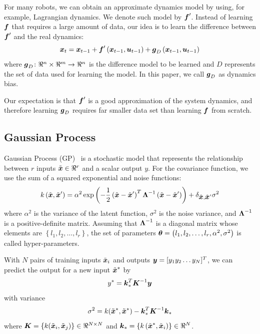 For many robots, we can obtain an approximate dynamics model by using,
for example, Lagrangian dynamics.
We denote such model by $\mbox{\boldmath \(f\)}'$.
Instead of learning $\mbox{\boldmath \(f\)}$ that requires a large amount of data,
our idea is to learn the difference between $\mbox{\boldmath \(f\)}'$ and the real
dynamics:
\begin{equation}
\mbox{\boldmath \(x\)}_t = \mbox{\boldmath \(x\)}_{t-1} + \mbox{\boldmath \(f\)}'\left(\mbox{\boldmath \(x\)}_{t-1},
\mbox{\boldmath \(u\)}_{t-1}\right) +
\mbox{\boldmath \(g\)}_D\left(\mbox{\boldmath \(x\)}_{t-1},\mbox{\boldmath \(u\)}_{t-1}\right)
\end{equation}
where $\mbox{\boldmath \(g\)}_D\colon
\Re^{n}\times\Re^{m}\rightarrow\Re^{n}$ is the difference
model to be learned and $D$ 
represents the set of data used for learning the model.
In this paper, we call $\mbox{\boldmath \(g\)}_D$ as dynamics bias.

Our expectation is that $\mbox{\boldmath \(f\)}'$ is a good approximation of the system
dynamics, and therefore learning $\mbox{\boldmath \(g\)}_D$ requires far smaller
data set than learning $\mbox{\boldmath \(f\)}$ from scratch.

\subsection{Gaussian Process}


Gaussian Process (GP)~\cite{bib-rasmussen-gp} is a stochastic model that
represents the relationship between $r$ inputs
$\tilde{\mbox{\boldmath \(x\)}}\in \Re^{r}$ and a scalar output $y$.
For the covariance function, we use the sum of a squared exponential
and noise functions:
\begin{equation}
k\left(\tilde{\mbox{\boldmath \(x\)}}, \tilde{\mbox{\boldmath \(x\)}}'\right) = \alpha^2 \exp \left(
-\frac{1}{2} \left(\tilde{\mbox{\boldmath \(x\)}} - \tilde{\mbox{\boldmath \(x\)}}'\right)^T
\mbox{\boldmath \(\Lambda\)}^{-1} \left(\tilde{\mbox{\boldmath \(x\)}} - \tilde{\mbox{\boldmath \(x\)}}'\right)
\right)
+ \delta_{\tilde{\mbox{\boldmath \(x\)}}, \tilde{\mbox{\boldmath \(x\)}}'} \sigma^2
\end{equation}
where $\alpha^2$ is the variance of the latent function, $\sigma^2$ is
the noise variance, and $\mbox{\boldmath \(\Lambda\)}^{-1}$ is a positive-definite
matrix. 
Assuming that $\mbox{\boldmath \(\Lambda\)}^{-1}$ is a diagonal matrix whose
elements are $\left\{l_1, l_2, \ldots, l_r\right\}$, the set of
parameters $\mbox{\boldmath \(\theta\)} =
\left(l_1,l_2,\ldots,l_r,\alpha^2,\sigma^2\right)$ is called
hyper-parameters. 

With $N$ pairs of training inputs $\tilde{\mbox{\boldmath \(x\)}}_i$ and outputs
$\mbox{\boldmath \(y\)}=[y_1y_2 \ldots y_N]^T$,
we can predict the output for a new
input $\tilde{\mbox{\boldmath \(x\)}}^*$ by
\begin{equation}
y^* = \mbox{\boldmath \(k\)}_*^T \mbox{\boldmath \(K\)}^{-1} \mbox{\boldmath \(y\)}
\end{equation}
with variance
\begin{equation}
\sigma^2 = k(\tilde{\mbox{\boldmath \(x\)}}^*, \tilde{\mbox{\boldmath \(x\)}}^*) -
\mbox{\boldmath \(k\)}_*^{T} \mbox{\boldmath \(K\)}^{-1} \mbox{\boldmath \(k\)}_*
\end{equation}
where $\mbox{\boldmath \(K\)} = \left\{ k(\tilde{\mbox{\boldmath \(x\)}}_i,
\tilde{\mbox{\boldmath \(x\)}}_j)\right\} \in\Re^{N\times N}$ and 
$\mbox{\boldmath \(k\)}_* = \left\{
k\left(\tilde{\mbox{\boldmath \(x\)}}^*,\tilde{\mbox{\boldmath \(x\)}}_i\right)\right\} 
\in \Re^{N}$.


